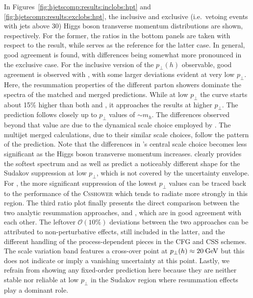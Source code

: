 In Figures~\ref{fig:hjetscomp:results:inclobs:hpt} and
\ref{fig:hjetscomp:results:exclobs:hpt}, the inclusive and exclusive
(i.e.~vetoing events with jets above $30$\gev) Higgs boson transverse momentum
distributions are shown, respectively.  For the former, the ratios in
the bottom panels are taken with respect to the \HqT result, while
\Powheg \NNLOPS serves as the reference for the latter case. In
general, good agreement is found, with differences being somewhat more
pronounced in the exclusive case. For the inclusive version of the
$p_\perp(h)$ observable,  good agreement is observed with \HqT,
with some larger deviations evident at very low $p_\perp$. Here, the
resummation properties of the different parton showers dominate the
spectra of the matched and merged predictions. While at low $p_\perp$
the \Sherpa \NNLOPS curve starts about 15\% higher than both \HqT and
\Powheg \NNLOPS, it approaches the \HqT results at higher $p_\perp$.
The \Powheg \NNLOPS  prediction follows 
\HqT closely up to $p_\perp$ values of $\sim m_h$. The differences 
observed beyond that value are due to the 
dynamical scale choice employed by \Powheg \NNLOPS. The multijet merged calculations, due to their
similar scale choices, follow the pattern of the \Powheg \NNLOPS
prediction. Note that the differences in \MGaMC's central scale
choice becomes less significant as the Higgs boson transverse momentum
increases. \Herwig clearly provides the softest spectrum and \Sherpa
as well as \MGaMC predict a noticeably different shape for the Sudakov
suppression at low $p_\perp$, which is not covered by the \HqT
uncertainty envelope. For \Sherpa, the more significant suppression of
the lowest $p_\perp$ values can be traced back to the performance of the
\textsc{Csshower} which tends to radiate more strongly in this region.
The third ratio plot finally presents the direct comparison between
the two analytic resummation approaches, \HqT and \Resbos,
which are in good agreement with each other. The leftover
$\mathcal{O}(10\%)$ deviations between the two approaches can be
attributed to non-perturbative effects, still included in the latter, and the different handling of
the process-dependent pieces in the CFG and CSS schemes. The
\Resbos scale variation band features a cross-over point at
$p_\perp(h)\approx20\text{\:GeV}$ but this does not indicate or imply a
vanishing uncertainty at this point.
Lastly, we refrain from showing any fixed-order prediction here
because they are neither stable nor reliable at low $p_\perp$ in the
Sudakov region where resummation effects play a dominant role.

